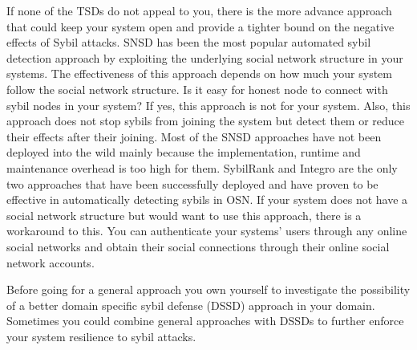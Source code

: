 \documentclass[conference]{IEEEtran}
\begin{document}
If none of the TSDs do not appeal to you, there is the more advance approach that could keep your system open and provide a tighter bound on the negative effects of Sybil attacks. SNSD has been the most popular automated sybil detection approach by exploiting the underlying social network structure in your systems. The effectiveness of this approach depends on how much your system follow the social network structure. Is it easy for honest node to connect with sybil nodes in your system? If yes, this approach is not for your system. Also, this approach does not stop sybils from joining the system but detect them or reduce their effects after their joining. Most of the SNSD approaches have not been deployed into the wild mainly because the implementation, runtime and maintenance overhead is too high for them. SybilRank and Integro are the only two approaches that have been successfully deployed and have proven to be effective in automatically detecting sybils in OSN. If your system does not have a social network structure but would want to use this approach, there is a workaround to this. You can authenticate your systems' users through any online social networks and obtain their social connections through their online social network accounts.

Before going for a general approach you own yourself to investigate the possibility of a better domain specific sybil defense (DSSD) approach in your domain. Sometimes you could combine general approaches with DSSDs to further enforce your system resilience to sybil attacks.

%
%
\end{document}
